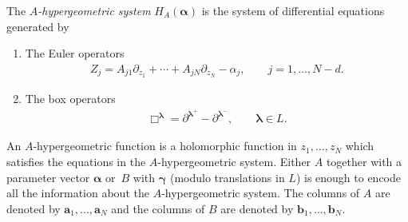 \documentclass[pdftex]{sigma}
\numberwithin{equation}{section}
\begin{document}
{\samepage
The {\it $A$-hypergeometric system} $H_{A}(\bm{\alpha})$ is the system of differential equations generated by
\begin{enumerate}\itemsep=0pt
\item The Euler operators
\begin{gather*}%
Z_j=A_{j1}\partial_{z_1}+\cdots+A_{jN}\partial_{z_N}-\alpha_j,\qquad j=1,\dots,N-d.
\end{gather*}
\item The box operators
\begin{gather*}%
\Box^{\bm{\lambda}}=\partial^{\bm{\lambda}^+}-\partial^{\bm{\lambda}^-},\qquad
\bm{\lambda}\in L.
\end{gather*}
\end{enumerate}}

An $A$-hypergeometric function is a holomorphic
function in $z_1,\dots,z_N$ which satisfies the equations in the $A$-hypergeometric system. Either $A$ together with a parameter vector $\bm{\alpha}$ or~$B$
with $\bm{\gamma}$ (modulo translations in $L$) is enough to encode all the information about the $A$-hypergeometric system. The columns of $A$ are denoted by $\bm{a}_1,\dots,\bm{a}_N$ and the columns of $B$ are denoted by $\bm{b}_1,\dots,\bm{b}_N$.
\end{document}
